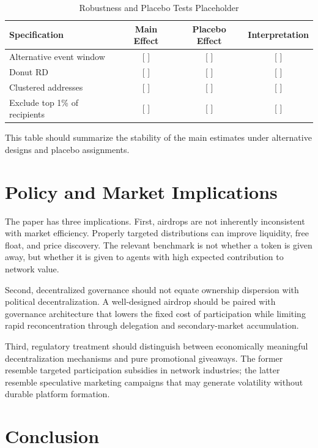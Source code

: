 \documentclass[11pt]{article}
\theoremstyle{remark}
\begin{document}
\begin{table}[H]
\centering
\begin{threeparttable}
\caption{Robustness and Placebo Tests Placeholder}
\label{tab:robustness}
\begin{tabular}{lccc}
\toprule
Specification & Main Effect & Placebo Effect & Interpretation \\
\midrule
Alternative event window & [ ] & [ ] & [ ] \\
Donut RD & [ ] & [ ] & [ ] \\
Clustered addresses & [ ] & [ ] & [ ] \\
Exclude top 1\% of recipients & [ ] & [ ] & [ ] \\
\bottomrule
\end{tabular}
\begin{tablenotes}
\footnotesize
\item This table should summarize the stability of the main estimates under alternative designs and placebo assignments.
\end{tablenotes}
\end{threeparttable}
\end{table}

\section{Policy and Market Implications}

The paper has three implications. First, airdrops are not inherently inconsistent with market efficiency. Properly targeted distributions can improve liquidity, free float, and price discovery. The relevant benchmark is not whether a token is given away, but whether it is given to agents with high expected contribution to network value.

Second, decentralized governance should not equate ownership dispersion with political decentralization. A well-designed airdrop should be paired with governance architecture that lowers the fixed cost of participation while limiting rapid reconcentration through delegation and secondary-market accumulation.

Third, regulatory treatment should distinguish between economically meaningful decentralization mechanisms and pure promotional giveaways. The former resemble targeted participation subsidies in network industries; the latter resemble speculative marketing campaigns that may generate volatility without durable platform formation.

\section{Conclusion}
\end{document}
